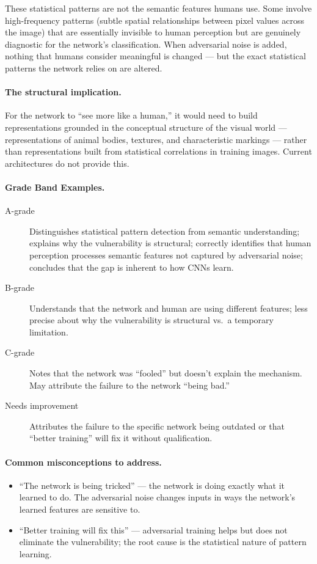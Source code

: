 These statistical patterns are not the semantic features humans use. Some involve high-frequency patterns (subtle spatial relationships between pixel values across the image) that are essentially invisible to human perception but are genuinely diagnostic for the network's classification. When adversarial noise is added, nothing that humans consider meaningful is changed --- but the exact statistical patterns the network relies on are altered.

\paragraph{The structural implication.}

For the network to ``see more like a human,'' it would need to build representations grounded in the conceptual structure of the visual world --- representations of animal bodies, textures, and characteristic markings --- rather than representations built from statistical correlations in training images. Current architectures do not provide this.

\paragraph{Grade Band Examples.}

\begin{description}
    \item[A-grade] Distinguishes statistical pattern detection from semantic understanding; explains why the vulnerability is structural; correctly identifies that human perception processes semantic features not captured by adversarial noise; concludes that the gap is inherent to how CNNs learn.

    \item[B-grade] Understands that the network and human are using different features; less precise about why the vulnerability is structural vs.\ a temporary limitation.

    \item[C-grade] Notes that the network was ``fooled'' but doesn't explain the mechanism. May attribute the failure to the network ``being bad.''

    \item[Needs improvement] Attributes the failure to the specific network being outdated or that ``better training'' will fix it without qualification.
\end{description}

\paragraph{Common misconceptions to address.}
\begin{itemize}
    \item ``The network is being tricked'' --- the network is doing exactly what it learned to do. The adversarial noise changes inputs in ways the network's learned features are sensitive to.
    \item ``Better training will fix this'' --- adversarial training helps but does not eliminate the vulnerability; the root cause is the statistical nature of pattern learning.
\end{itemize}


